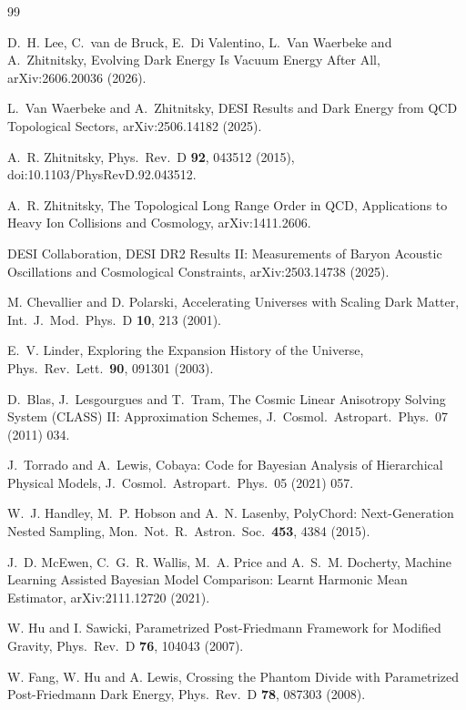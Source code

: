 \documentclass[11pt]{article}
\begin{document}
\begin{thebibliography}{99}

D.~H. Lee, C.~van de Bruck, E.~Di Valentino, L.~Van Waerbeke and A.~Zhitnitsky, Evolving Dark Energy Is Vacuum Energy After All, arXiv:2606.20036 (2026).

L.~Van Waerbeke and A.~Zhitnitsky, DESI Results and Dark Energy from QCD Topological Sectors, arXiv:2506.14182 (2025).

A.~R. Zhitnitsky, Phys.\ Rev.\ D \textbf{92}, 043512 (2015), doi:10.1103/PhysRevD.92.043512.

A.~R. Zhitnitsky, The Topological Long Range Order in QCD, Applications to Heavy Ion Collisions and Cosmology, arXiv:1411.2606.

DESI Collaboration, DESI DR2 Results II: Measurements of Baryon Acoustic Oscillations and Cosmological Constraints, arXiv:2503.14738 (2025).

M. Chevallier and D. Polarski, Accelerating Universes with Scaling Dark Matter, Int.\ J.\ Mod.\ Phys.\ D \textbf{10}, 213 (2001).

E.~V. Linder, Exploring the Expansion History of the Universe, Phys.\ Rev.\ Lett.\ \textbf{90}, 091301 (2003).

D.~Blas, J.~Lesgourgues and T.~Tram, The Cosmic Linear Anisotropy Solving System (CLASS) II: Approximation Schemes, J.\ Cosmol.\ Astropart.\ Phys.\ 07 (2011) 034.

J.~Torrado and A.~Lewis, Cobaya: Code for Bayesian Analysis of Hierarchical Physical Models, J.\ Cosmol.\ Astropart.\ Phys.\ 05 (2021) 057.

W.~J. Handley, M.~P. Hobson and A.~N. Lasenby, PolyChord: Next-Generation Nested Sampling, Mon.\ Not.\ R.\ Astron.\ Soc.\ \textbf{453}, 4384 (2015).

J.~D. McEwen, C.~G.~R. Wallis, M.~A. Price and A.~S.~M. Docherty, Machine Learning Assisted Bayesian Model Comparison: Learnt Harmonic Mean Estimator, arXiv:2111.12720 (2021).

W. Hu and I. Sawicki, Parametrized Post-Friedmann Framework for Modified Gravity, Phys.\ Rev.\ D \textbf{76}, 104043 (2007).

W. Fang, W. Hu and A. Lewis, Crossing the Phantom Divide with Parametrized Post-Friedmann Dark Energy, Phys.\ Rev.\ D \textbf{78}, 087303 (2008).

\end{thebibliography}
\end{document}
